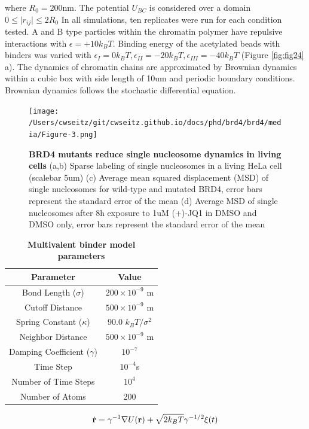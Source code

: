 where $R_0=200$nm. The potential $U_{BC}$ is considered over a domain $0\leq\lvert r_{ij}\lvert\leq 2 R_0$ In all simulations, ten replicates were run for each condition tested. A and B type particles within the chromatin polymer have repulsive interactions with $\epsilon = +10k_{B}T$. Binding energy of the acetylated beads with binders was varied with $\epsilon_{I} = 0 k_{B}T,\epsilon_{II} = -20k_{B}T,\epsilon_{III}=-40k_{B}T$ (Figure \ref{fig:fig24} a). The dynamics of chromatin chains are approximated by Brownian dynamics within a cubic box with side length of 10um and periodic boundary conditions. Brownian dynamics follows the stochastic differential equation.

\begin{figure}[t]
\texttt{[image: /Users/cwseitz/git/cwseitz.github.io/docs/phd/brd4/brd4/media/Figure-3.png]}
\caption{\textbf{BRD4 mutants reduce single nucleosome dynamics in living cells} (a,b) Sparse labeling of single nucleosomes in a living HeLa cell (scalebar 5um) (c) Average mean squared displacement (MSD) of single nucleosomes for wild-type and mutated BRD4, error bars represent the standard error of the mean (d) Average MSD of single nucleosomes after 8h exposure to 1uM (+)-JQ1 in DMSO and DMSO only, error bars represent the standard error of the mean}
\label{fig:fig26}
\end{figure}

\begin{table}[h!]
\centering
\begin{tabular}{|c|c|}
\hline
\textbf{Parameter} & \textbf{Value} \\ \hline
Bond Length ($\sigma$) & $200 \times 10^{-9}$ m \\ \hline
Cutoff Distance & $500 \times 10^{-9}$ m \\ \hline
Spring Constant ($\kappa$) & 90.0 $k_{B}T/\sigma^2$ \\ \hline
Neighbor Distance & $500 \times 10^{-9}$ m \\ \hline
Damping Coefficient ($\gamma$) & $10^{-7}$ \\ \hline
Time Step & $10^{-4}$s\\ \hline
Number of Time Steps & $10^4$ \\ \hline
Number of Atoms & 200 \\ \hline
\end{tabular}
\caption{\textbf{Multivalent binder model parameters}}
\end{table}

\begin{equation}
\dot{\bold{r}} = \gamma^{-1}\nabla U(\bold{r}) +\sqrt{2 k_{B}T}\gamma^{-1/2}\xi(t)
\end{equation}

